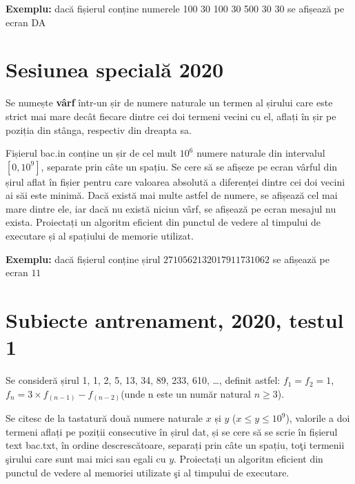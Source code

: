 \documentclass[10pt, a4paper]{article}
\newcommand{\highlight}[1]{{\ttfamily\color{red}#1}}
\begin{document}
\vspace{0.2cm}
\noindent \textbf{Exemplu:} dacă fișierul conține numerele \highlight{100 30 100 30 500 30 30} se afișează pe ecran \highlight{DA}

\section{Sesiunea specială 2020}
Se numește \textbf{vârf} într-un șir de numere naturale un termen al șirului care este strict mai mare decât fiecare dintre cei doi termeni vecini cu el, aflați în șir pe poziția din stânga, respectiv din dreapta sa.

\vspace{0.2cm}
\noindent Fișierul bac.in conține un șir de cel mult \highlight{$10^6$} numere naturale din intervalul \highlight{$[0,10^9]$}, separate prin câte un spațiu. Se cere să se afișeze pe ecran vârful din șirul aflat în fișier pentru care valoarea absolută a diferenței dintre cei doi vecini ai săi este minimă. Dacă există mai multe astfel de numere, se afișează cel mai mare dintre ele, iar dacă nu există niciun vârf, se afișează pe ecran mesajul \highlight{nu exista}. Proiectați un algoritm eficient din punctul de vedere al timpului de executare și al spațiului de memorie utilizat.

\vspace{0.2cm}
\noindent \textbf{Exemplu:} dacă fișierul conține șirul \highlight{$2 7 10 5 6 2 1 3 20 17 9 11 7 3 10 6 2$} se afișează pe ecran \highlight{$11$}

\section{Subiecte antrenament, 2020, testul 1}
Se consideră șirul \highlight{1, 1, 2, 5, 13, 34, 89, 233, 610, \dots}, definit astfel: $f_1=f_2=1$, $f_n = 3 \times f_(n-1) - f_(n-2)$(unde \highlight{n} este un număr natural \highlight{$n \geq 3$}).

\vspace{0.2cm}
\noindent Se citesc de la tastatură două numere naturale \highlight{$x$} și \highlight{$y$} (\highlight{$x \leq y \leq 10^9$}), valorile a doi termeni aflați pe poziții consecutive în șirul dat, și se cere să se scrie în fișierul text \highlight{bac.txt}, în ordine descrescătoare, separați prin câte un spațiu, toţi termenii şirului care sunt mai mici sau egali cu \highlight{$y$}. Proiectați un algoritm eficient din punctul de vedere al memoriei utilizate şi al timpului de executare.
\end{document}
